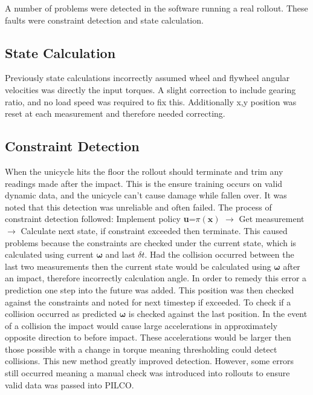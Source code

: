 \documentclass[twoside,twocolumn,12pt]{article}
\begin{document}
\clearpage
{}
A number of problems were detected in the software running a real rollout. These faults were constraint detection and state calculation.
\subsection{State Calculation}
Previously state calculations incorrectly assumed wheel and flywheel angular velocities was directly the input torques. A slight correction to include gearing ratio, and no load speed was required to fix this. Additionally x,y position was reset at each measurement and therefore needed correcting.
\subsection{Constraint Detection}
When the unicycle hits the floor the rollout should terminate and trim any readings made after the impact. This is the ensure training occurs on valid dynamic data, and the unicycle can't cause damage while fallen over. It was noted that this detection was unreliable and often failed.
\newline
The process of constraint detection followed: Implement policy \textbf{u}=$\pi (\textbf{x})$ $\rightarrow$ Get measurement $\rightarrow$ Calculate next state, if constraint exceeded then terminate. This caused problems because the constraints are checked under the current state, which is calculated using current $\boldsymbol{ \omega }$ and last $\delta t$. Had the collision occurred between the last two measurements then the current state would be calculated using $\boldsymbol{\omega}$ after an impact, therefore incorrectly calculation angle.
\newline
In order to remedy this error a prediction one step into the future was added. This position was then checked against the constraints and noted for next timestep if exceeded. To check if a collision occurred as predicted $\boldsymbol{\omega}$ is checked against the last position. In the event of a collision the impact would cause large accelerations in approximately opposite direction to before impact. These accelerations would be larger then those possible with a change in torque meaning thresholding could detect collisions.
\newline
This new method greatly improved detection. However, some errors still occurred meaning a manual check was introduced into rollouts to ensure valid data was passed into PILCO. 
\end{document}
